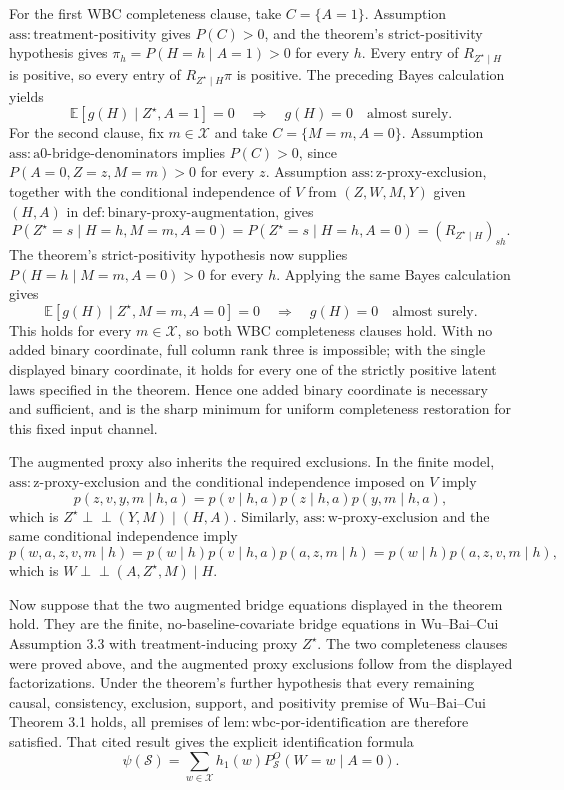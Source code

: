 For the first WBC completeness clause, take \(C=\{A=1\}\). Assumption \(\mathrm{ass{:}treatment\text{-}positivity}\) gives \(P(C)>0\), and the theorem's strict-positivity hypothesis gives \(\pi_h=P(H=h\mid A=1)>0\) for every \(h\). Every entry of \(R_{Z^{\star}\mid H}\) is positive, so every entry of \(R_{Z^{\star}\mid H}\pi\) is positive. The preceding Bayes calculation yields
\[
 \mathbb E[g(H)\mid Z^{\star},A=1]=0
 \quad\Longrightarrow\quad
 g(H)=0\quad\text{almost surely}.
\]
For the second clause, fix \(m\in\mathcal X\) and take \(C=\{M=m,A=0\}\). Assumption \(\mathrm{ass{:}a0\text{-}bridge\text{-}denominators}\) implies \(P(C)>0\), since \(P(A=0,Z=z,M=m)>0\) for every \(z\). Assumption \(\mathrm{ass{:}z\text{-}proxy\text{-}exclusion}\), together with the conditional independence of \(V\) from \((Z,W,M,Y)\) given \((H,A)\) in \(\mathrm{def{:}binary\text{-}proxy\text{-}augmentation}\), gives
\[
 P(Z^{\star}=s\mid H=h,M=m,A=0)
 =P(Z^{\star}=s\mid H=h,A=0)
 =(R_{Z^{\star}\mid H})_{sh}.
\]
The theorem's strict-positivity hypothesis now supplies \(P(H=h\mid M=m,A=0)>0\) for every \(h\). Applying the same Bayes calculation gives
\[
 \mathbb E[g(H)\mid Z^{\star},M=m,A=0]=0
 \quad\Longrightarrow\quad
 g(H)=0\quad\text{almost surely}.
\]
This holds for every \(m\in\mathcal X\), so both WBC completeness clauses hold. With no added binary coordinate, full column rank three is impossible; with the single displayed binary coordinate, it holds for every one of the strictly positive latent laws specified in the theorem. Hence one added binary coordinate is necessary and sufficient, and is the sharp minimum for uniform completeness restoration for this fixed input channel.

The augmented proxy also inherits the required exclusions. In the finite model, \(\mathrm{ass{:}z\text{-}proxy\text{-}exclusion}\) and the conditional independence imposed on \(V\) imply
\[
 p(z,v,y,m\mid h,a)
 =p(v\mid h,a)p(z\mid h,a)p(y,m\mid h,a),
\]
which is \(Z^{\star}\mathbin{\perp\!\!\!\perp}(Y,M)\mid(H,A)\). Similarly, \(\mathrm{ass{:}w\text{-}proxy\text{-}exclusion}\) and the same conditional independence imply
\[
 p(w,a,z,v,m\mid h)
 =p(w\mid h)p(v\mid h,a)p(a,z,m\mid h)
 =p(w\mid h)p(a,z,v,m\mid h),
\]
which is \(W\mathbin{\perp\!\!\!\perp}(A,Z^{\star},M)\mid H\).

Now suppose that the two augmented bridge equations displayed in the theorem hold. They are the finite, no-baseline-covariate bridge equations in Wu--Bai--Cui Assumption 3.3 with treatment-inducing proxy \(Z^{\star}\). The two completeness clauses were proved above, and the augmented proxy exclusions follow from the displayed factorizations. Under the theorem's further hypothesis that every remaining causal, consistency, exclusion, support, and positivity premise of Wu--Bai--Cui Theorem 3.1 holds, all premises of \(\mathrm{lem{:}wbc\text{-}por\text{-}identification}\) are therefore satisfied. That cited result gives the explicit identification formula
\[
 \psi(\mathcal S)
 =\sum_{w\in\mathcal X}h_1(w)P_{\mathcal S}^O(W=w\mid A=0).
\]

